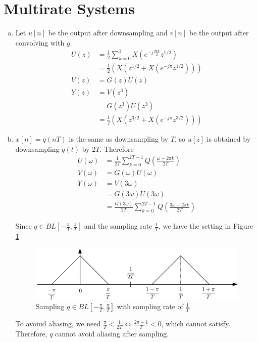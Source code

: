 \section{Multirate Systems}\label{sec:p3}

\begin{enumerate}[(a)]
\item Let $u[n]$ be the output after downsampling and $v[n]$ be the output after convolving with $g$.
\begin{align*}
	U(z) &= \frac{1}{2} \sum_{k=0}^{1}X\left(e^{-j\frac{2\pi k}{2}} z^{1/2}\right)\\
	&= \frac{1}{2} \left(X(z^{1/2} + X(e^{-j\pi}z^{1/2}))\right) \\
	V(z) &= G(z)U(z) \\
	Y(z) &= V(z^3) \\
	&= G(z^3)U(z^3) \\
	&= \frac{1}{2} \left(X(z^{3/2} + X(e^{-j\pi}z^{3/2}))\right)
\end{align*}

\item $x[n] = q(nT)$ is the same as downsampling by $T$, so $u[z]$ is obtained by downsampling $q(t)$ by $2T$. Therefore
\begin{align*}
	U(\omega) &= \frac{1}{2T} \sum_{k=0}^{2T-1} Q\left(\frac{\omega-2\pi k}{2T}\right) \\
	V(\omega) &= G(\omega)U(\omega) \\
	Y(\omega) &= V(3\omega) \\
	&= G(3\omega)U(3\omega) \\
	&= \frac{G(3\omega)}{2T} \sum_{k=0}^{2T-1} Q\left(\frac{3\omega-2\pi k}{2T}\right)
\end{align*}

Since $q \in BL[-\frac{\pi}{T}, \frac{\pi}{T}]$ and the sampling rate $\frac{1}{T}$, we have the setting in Figure \ref{fig:p3}
\begin{figure}[htbp]
	\centering
	\includegraphics[width=\textwidth]{images/p3}
	\caption{Sampling $q \in BL[-\frac{\pi}{T}, \frac{\pi}{T}]$ with sampling rate of $\frac{1}{T}$}
	\label{fig:p3}
\end{figure}
To avoiud aliasing, we need $\frac{\pi}{T} < \frac{1}{2T} \Leftrightarrow \frac{2\pi-1}{T} < 0$, which cannot satisfy. Therefore, $q$ cannot avoid aliasing after sampling.
\end{enumerate}
